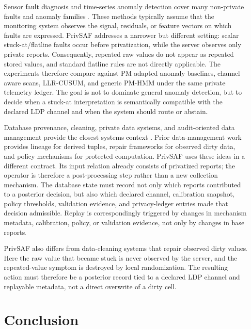 \documentclass[conference]{IEEEtran}
\begin{document}
Sensor fault diagnosis and time-series anomaly detection cover many
non-private faults and anomaly families
\cite{isermann2005fault,chen2006distributedfault,chen2013faultresilient,
chandola2009anomaly,lavin2015nab,ahmad2017nab,xu2021anomaly,
deng2021graph,li2021multivariate,audibert2020usad}. These methods typically
assume that the monitoring system observes the signal, residuals, or feature
vectors on which faults are expressed. PrivSAF addresses a narrower but
different setting: scalar stuck-at/flatline faults occur before privatization,
while the server observes only private reports. Consequently, repeated raw
values do not appear as repeated stored values, and standard flatline rules are
not directly applicable. The experiments therefore compare against
PM-adapted anomaly baselines, channel-aware scans, LLR-CUSUM, and generic
PM-HMM under the same private telemetry ledger. The goal is not to dominate
general anomaly detection, but to decide when a stuck-at interpretation is
semantically compatible with the declared LDP channel and when the system
should route or abstain.

Database provenance, cleaning, private data systems, and audit-oriented data
management provide the closest systems context
\cite{cui2000lineage,buneman2001whywhere}. Prior data-management work provides
lineage for derived tuples, repair frameworks for observed dirty data, and
policy mechanisms for protected computation. PrivSAF uses these ideas in a
different contract. Its input relation already consists of privatized reports;
the operator is therefore a post-processing step rather than a new collection
mechanism. The database state must record not only which reports contributed
to a posterior decision, but also which declared channel, calibration snapshot,
policy thresholds, validation evidence, and privacy-ledger entries made that
decision admissible. Replay is correspondingly triggered by changes in
mechanism metadata, calibration, policy, or validation evidence, not only by
changes in base reports.

PrivSAF also differs from data-cleaning systems that repair observed dirty
values. Here the raw value that became stuck is never observed by the server,
and the repeated-value symptom is destroyed by local randomization. The
resulting action must therefore be a posterior record tied to a declared LDP
channel and replayable metadata, not a direct overwrite of a dirty cell.


\section{Conclusion}
\label{sec:conclusion}
\end{document}
